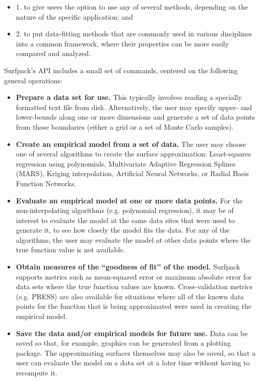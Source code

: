 \documentclass{article}
\begin{document}
\begin{itemize}
\item 1. to give users the option to use any of several methods, depending on the nature of the specific application; and
\item 2. to put data-fitting methods that are commonly used in various disciplines into a common framework, where their properties can be more easily compared and analyzed.
\end{itemize}
Surfpack's API includes a small set of commands, centered on the following general operations:
\begin{itemize}
\item {\bf Prepare a data set for use.}  This typically involves reading a specially formatted text file from disk.  Alternatively, the user may specify upper- and lower-bounds along one or more dimensions and generate a set of data points from those boundaries (either a grid or a set of Monte Carlo samples).
\item {\bf Create an empirical model from a set of data.} The user may choose one of several algorithms to create the surface approximation: Least-squares regression using polynomials, Multivariate Adaptive Regression Splines (MARS), Kriging interpolation, Artificial Neural Networks, or Radial Basis Function Networks.
\item {\bf Evaluate an empirical model at one or more data points.}  For the non-interpolating algorithms (e.g. polynomial regression), it may be of interest to evaluate the model at the same data sites that were used to generate it, to see how closely the model fits the data.  For any of the algorithms, the user may evaluate the model at other data points where the true function value is not available.
\item {\bf Obtain measures of the ``goodness of fit'' of the model.}  Surfpack supports metrics such as mean-squared error or maximum absolute error for data sets where the true function values are known.  Cross-validation metrics (e.g. PRESS) are also available for situations where all of the known data points for the function that is being approximated were used in creating the empirical model.
\item {\bf Save the data and/or empirical models for future use.}  Data can be saved so that, for example, graphics can be generated from a plotting package.  The approximating surfaces themselves may also be saved, so that a user can evaluate the model on a data set at a later time without having to recompute it.
\end{itemize}
\end{document}
